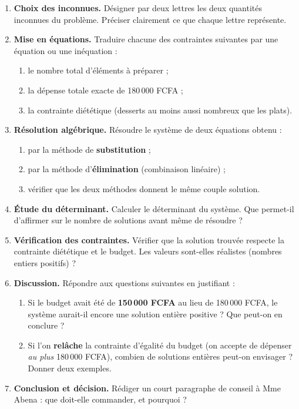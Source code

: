 \documentclass[11pt]{article}
\begin{document}
\begin{enumerate}
\item \textbf{Choix des inconnues.} Désigner par deux lettres les deux quantités inconnues du problème. Préciser clairement ce que chaque lettre représente.
\item \textbf{Mise en équations.} Traduire chacune des contraintes suivantes par une équation ou une inéquation :
\begin{enumerate}
\item le nombre total d'éléments à préparer ;
\item la dépense totale exacte de 180\,000 FCFA ;
\item la contrainte diététique (desserts au moins aussi nombreux que les plats).
\end{enumerate}
\item \textbf{Résolution algébrique.} Résoudre le système de deux équations obtenu :
\begin{enumerate}
\item par la méthode de \textbf{substitution} ;
\item par la méthode d'\textbf{élimination} (combinaison linéaire) ;
\item vérifier que les deux méthodes donnent le même couple solution.
\end{enumerate}
\item \textbf{Étude du déterminant.} Calculer le déterminant du système. Que permet-il d'affirmer sur le nombre de solutions avant même de résoudre ?
\item \textbf{Vérification des contraintes.} Vérifier que la solution trouvée respecte la contrainte diététique et le budget. Les valeurs sont-elles réalistes (nombres entiers positifs) ?
\item \textbf{Discussion.} Répondre aux questions suivantes en justifiant :
\begin{enumerate}
\item Si le budget avait été de \textbf{150\,000 FCFA} au lieu de 180\,000 FCFA, le système aurait-il encore une solution entière positive ? Que peut-on en conclure ?
\item Si l'on \textbf{relâche} la contrainte d'égalité du budget (on accepte de dépenser \emph{au plus} 180\,000 FCFA), combien de solutions entières peut-on envisager ? Donner deux exemples.
\end{enumerate}
\item \textbf{Conclusion et décision.} Rédiger un court paragraphe de conseil à Mme Abena : que doit-elle commander, et pourquoi ?
\end{enumerate}
\end{document}
